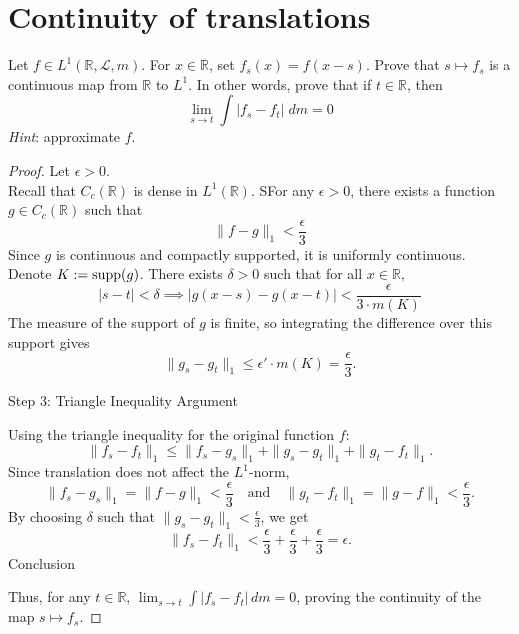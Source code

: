 \documentclass[lang=cn,11pt]{elegantbook}
\begin{document}
  \section{Continuity of translations}
  Let $f\in L^1(\mathbb{R}, \mathcal{L}, m)$. For $x\in\mathbb{R}$, set $f_s(x)= f(x-s)$. 
  Prove that $s\mapsto f_s$ is a continuous map from $\mathbb{R}$ to $L^1$. In other words, prove that if $t\in\mathbb{R}$, then 
  \[
    \lim_{s\to t} \int |f_s-f_t| \; d m =0 
  \]
  \textit{Hint}: approximate $f$. 
\begin{proof}

Let $\epsilon > 0$.\\
Recall that \( C_c(\mathbb{R}) \) is dense in \( L^1(\mathbb{R}) \). SFor any \(\epsilon > 0\), there exists a function \( g \in C_c(\mathbb{R}) \) such that
\[
\| f - g \|_1 < \frac{\epsilon}{3}
\] Since \( g \) is continuous and compactly supported, it is uniformly continuous. Denote $ K :=\operatorname{supp} (g) $. 
There exists \(\delta > 0\) such that for all \( x \in \mathbb{R} \),
\[
|s - t| < \delta \implies |g(x - s) - g(x - t)| < \frac{\epsilon}{3 \cdot m(K)}
\]
The measure of the support of \( g \) is finite, so integrating the difference over this support gives
\[
\| g_s - g_t \|_1 \leq \epsilon' \cdot m(K) = \frac{\epsilon}{3}.
\]

Step 3: Triangle Inequality Argument

Using the triangle inequality for the original function \( f \):
\[
\| f_s - f_t \|_1 \leq \| f_s - g_s \|_1 + \| g_s - g_t \|_1 + \| g_t - f_t \|_1.
\]
Since translation does not affect the \( L^1 \)-norm,
\[
\| f_s - g_s \|_1 = \| f - g \|_1 < \frac{\epsilon}{3} \quad \text{and} \quad \| g_t - f_t \|_1 = \| g - f \|_1 < \frac{\epsilon}{3}.
\]
By choosing \(\delta\) such that \(\| g_s - g_t \|_1 < \frac{\epsilon}{3}\), we get
\[
\| f_s - f_t \|_1 < \frac{\epsilon}{3} + \frac{\epsilon}{3} + \frac{\epsilon}{3} = \epsilon.
\]Conclusion

Thus, for any \( t \in \mathbb{R} \), \(\lim_{s \to t} \int |f_s - f_t| \, dm = 0 \), proving the continuity of the map \( s \mapsto f_s \).
\end{proof}
\end{document}
